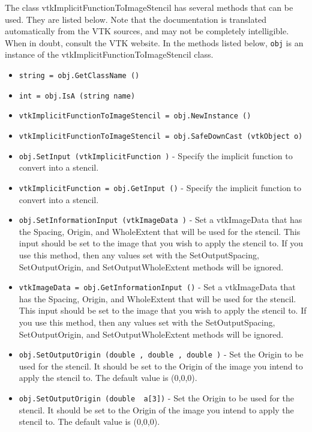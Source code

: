 The class vtkImplicitFunctionToImageStencil has several methods that can be used.
  They are listed below.
Note that the documentation is translated automatically from the VTK sources,
and may not be completely intelligible.  When in doubt, consult the VTK website.
In the methods listed below, \verb|obj| is an instance of the vtkImplicitFunctionToImageStencil class.
\begin{itemize}
\item  \verb|string = obj.GetClassName ()|

\item  \verb|int = obj.IsA (string name)|

\item  \verb|vtkImplicitFunctionToImageStencil = obj.NewInstance ()|

\item  \verb|vtkImplicitFunctionToImageStencil = obj.SafeDownCast (vtkObject o)|

\item  \verb|obj.SetInput (vtkImplicitFunction )| -  Specify the implicit function to convert into a stencil.

\item  \verb|vtkImplicitFunction = obj.GetInput ()| -  Specify the implicit function to convert into a stencil.

\item  \verb|obj.SetInformationInput (vtkImageData )| -  Set a vtkImageData that has the Spacing, Origin, and
 WholeExtent that will be used for the stencil.  This
 input should be set to the image that you wish to
 apply the stencil to.  If you use this method, then
 any values set with the SetOutputSpacing, SetOutputOrigin,
 and SetOutputWholeExtent methods will be ignored.

\item  \verb|vtkImageData = obj.GetInformationInput ()| -  Set a vtkImageData that has the Spacing, Origin, and
 WholeExtent that will be used for the stencil.  This
 input should be set to the image that you wish to
 apply the stencil to.  If you use this method, then
 any values set with the SetOutputSpacing, SetOutputOrigin,
 and SetOutputWholeExtent methods will be ignored.

\item  \verb|obj.SetOutputOrigin (double , double , double )| -  Set the Origin to be used for the stencil.  It should be
 set to the Origin of the image you intend to apply the
 stencil to. The default value is (0,0,0).

\item  \verb|obj.SetOutputOrigin (double  a[3])| -  Set the Origin to be used for the stencil.  It should be
 set to the Origin of the image you intend to apply the
 stencil to. The default value is (0,0,0).


\end{itemize}
